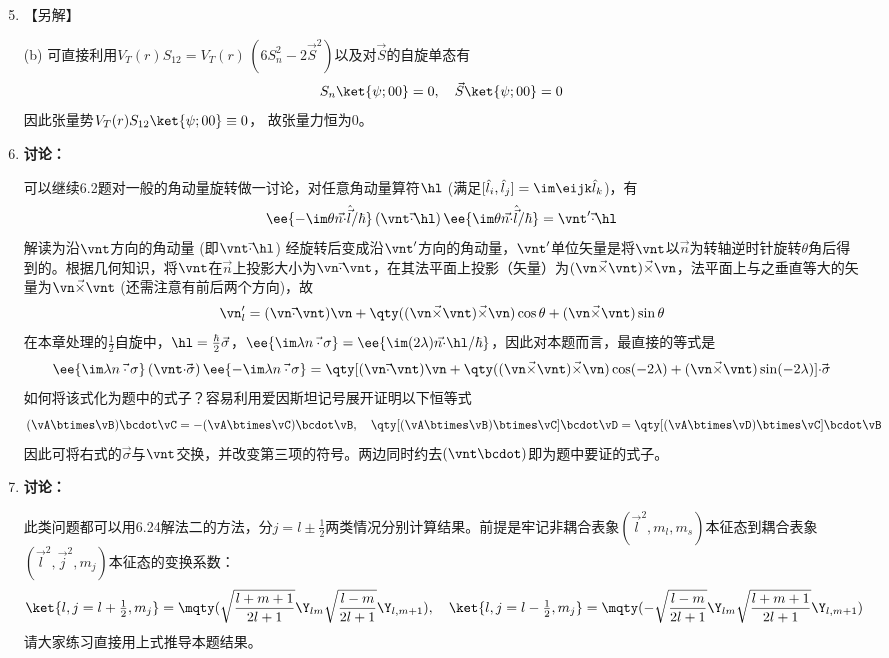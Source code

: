 \begin{enumerate}[label=\textbf{6.\arabic*}, listparindent=\parindent]
\setcounter{enumi}{4}
\item
【另解】

\noindent(b) 可直接利用$V_T(r)S_{12} = V_T(r)\,(6S_n^2-2\vec{S}^2)$以及对$\vec{S}$的自旋单态有
\[S_n\ket{\psi;00} = 0,\quad \vec{S}\ket{\psi;00}=0\]
因此张量势$V_T(r)S_{12}\ket{\psi;00}\equiv 0$，
故张量力恒为0。

\setcounter{enumi}{11}
\item
{\color{red}\textbf{讨论：}}

可以继续6.2题对一般的角动量旋转做一讨论，对任意角动量算符$\hl$ (满足$[\hat{l}_i,\hat{l}_j]=\im\eijk\hat{l}_k$)，有
\[\ee{-\im\theta \vec{n\cdot }\hat{\vec{l}}/\hbar}\,(\vnt\vec{\cdot}\hl)\,\ee{\im\theta \vec{n\cdot}\hat{\vec{l}}/\hbar} = \vnt'\vec{\cdot}\hl\]
解读为沿$\vnt$方向的角动量 (即$\vnt\vec{\cdot}\hl$) 经旋转后变成沿$\vnt'$方向的角动量，$\vnt'$单位矢量是将$\vnt$以$\vec{n}$为转轴逆时针旋转$\theta$角后得到的。根据几何知识，将$\vnt$在$\vec{n}$上投影大小为$\vn\vec{\cdot}\vnt$，在其法平面上投影（矢量）为$(\vn\vec{\times}\vnt)\vec{\times}\vn$，法平面上与之垂直等大的矢量为$\vn\vec{\times}\vnt$ (还需注意有前后两个方向)，故
\[\vn_l'=(\vn\vec{\cdot}\vnt)\vn+\qty((\vn\vec{\times}\vnt)\vec{\times}\vn)\cos\theta + (\vn\vec{\times}\vnt)\sin\theta\]
在本章处理的$\frac{1}{2}$自旋中，$\hl=\frac{\hbar}{2}\vec{\sigma}$，$\ee{\im\lambda\vec{n\cdot\sigma}} = \ee{\im(2\lambda)\vec{n\cdot }\hl/\hbar}$，因此对本题而言，最直接的等式是
\[\ee{\im\lambda \vec{n\cdot\sigma}}\,(\vnt\vec{\cdot\sigma})\,\ee{-\im\lambda \vec{n\cdot\sigma}} = \qty[(\vn\vec{\cdot}\vnt)\vn+\qty((\vn\vec{\times}\vnt)\vec{\times}\vn)\cos(-2\lambda) + (\vn\vec{\times}\vnt)\sin(-2\lambda)]\vec{\cdot \sigma}\]
如何将该式化为题中的式子？容易利用爱因斯坦记号展开证明以下恒等式
\[(\vA\btimes\vB)\bcdot\vC = -(\vA\btimes\vC)\bcdot\vB,\quad\qty[(\vA\btimes\vB)\btimes\vC]\bcdot\vD = \qty[(\vA\btimes\vD)\btimes\vC]\bcdot\vB\]
因此可将右式的$\vec{\sigma}$与$\vnt$交换，并改变第三项的符号。两边同时约去$(\vnt\bcdot)$即为题中要证的式子。

\setcounter{enumi}{22}
\item
{\color{red}\textbf{讨论：}}

此类问题都可以用6.24解法二的方法，分$j=l\pm\frac{1}{2}$两类情况分别计算结果。前提是牢记非耦合表象$(\vec{l}^2,m_l,m_s)$本征态到耦合表象$(\vec{l}^2,\vec{j}^2,m_j)$本征态的变换系数：
\[\ket{l,j=l+\tfrac{1}{2},m_j}=\mqty(\sqrt{\frac{l+m+1}{2l+1}}\Y_{lm}\\\sqrt{\frac{l-m}{2l+1}}\Y_{l,m+1}),\quad
\ket{l,j=l-\tfrac{1}{2},m_j}=\mqty(-\sqrt{\frac{l-m}{2l+1}}\Y_{lm}\\\sqrt{\frac{l+m+1}{2l+1}}\Y_{l,m+1})
\]
请大家练习直接用上式推导本题结果。


\end{enumerate}
